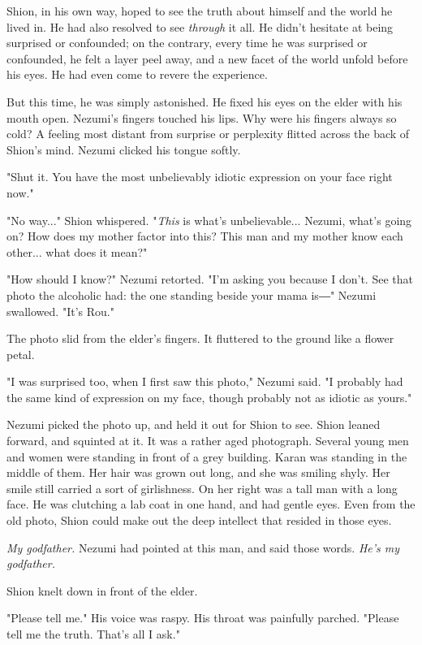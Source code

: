 Shion, in his own way, hoped to see the truth about himself and the
world he lived in. He had also resolved to see \emph{through} it all. He didn't
hesitate at being surprised or confounded; on the contrary, every time
he was surprised or confounded, he felt a layer peel away, and a new
facet of the world unfold before his eyes. He had even come to revere
the experience.

But this time, he was simply astonished. He fixed his eyes on the elder
with his mouth open. Nezumi's fingers touched his lips. Why were his
fingers always so cold? A feeling most distant from surprise or
perplexity flitted across the back of Shion's mind. Nezumi clicked his
tongue softly.

"Shut it. You have the most unbelievably idiotic expression on your face
right now."

"No way..." Shion whispered. "\emph{This} is what's unbelievable... Nezumi,
what's going on? How does my mother factor into this? This man and my
mother know each other... what does it mean?"

"How should I know?" Nezumi retorted. "I'm asking you because I don't.
See that photo the alcoholic had: the one standing beside your mama is―"
Nezumi swallowed. "It's Rou."

The photo slid from the elder's fingers. It fluttered to the ground like
a flower petal.

"I was surprised too, when I first saw this photo," Nezumi said. "I
probably had the same kind of expression on my face, though probably not
as idiotic as yours."

Nezumi picked the photo up, and held it out for Shion to see. Shion
leaned forward, and squinted at it. It was a rather aged photograph.
Several young men and women were standing in front of a grey building.
Karan was standing in the middle of them. Her hair was grown out long,
and she was smiling shyly. Her smile still carried a sort of
girlishness. On her right was a tall man with a long face. He was
clutching a lab coat in one hand, and had gentle eyes. Even from the old
photo, Shion could make out the deep intellect that resided in those
eyes.

\emph{My godfather.} Nezumi had pointed at this man, and said those words. \emph{He's
my godfather.}

Shion knelt down in front of the elder.

"Please tell me." His voice was raspy. His throat was painfully parched.
"Please tell me the truth. That's all I ask."

